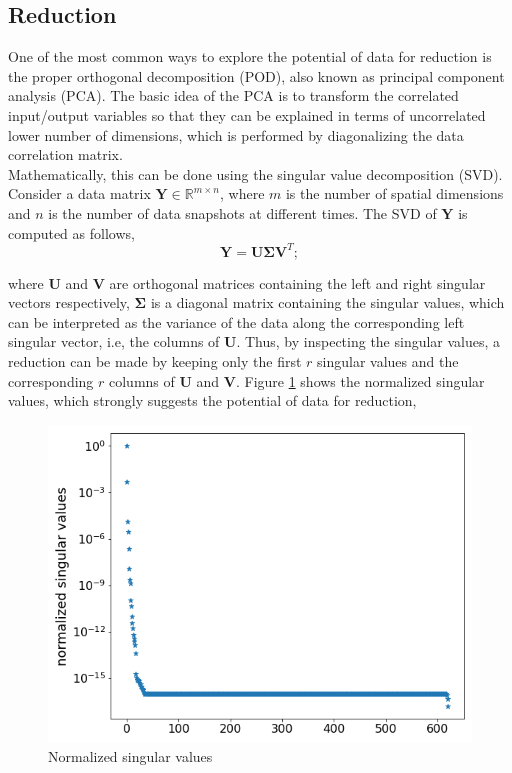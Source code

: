 \documentclass{anstrans}
\begin{document}
\subsection{Reduction}
One of the most common ways to explore the potential of data for reduction is the proper orthogonal decomposition (POD), also known as principal component analysis (PCA).
The basic idea of the PCA is to transform the correlated input/output variables so that they can be explained in terms of uncorrelated lower number of dimensions, which is performed by diagonalizing the data correlation matrix.\\
Mathematically, this can be done using the singular value decomposition (SVD). Consider a data matrix $\textbf{Y} \in \mathbb{R}^{m\times n}$,  where $m$ is the number of spatial dimensions and $n$ is the number of data snapshots at different times. The SVD of $\textbf{Y}$ is computed as follows, 
\begin{equation}
 \textbf{Y} =\textbf{U}\boldsymbol{\Sigma}\textbf{V}^T;
\end{equation}

where $\textbf{U}$ and $\textbf{V}$ are orthogonal matrices containing the left and right singular vectors respectively, $\boldsymbol{\Sigma}$ is a diagonal matrix containing the singular values, 
which can be interpreted as the variance of the data along the corresponding left singular vector, i.e, the columns of $\textbf{U}$. 
Thus, by inspecting the singular values, a reduction can be made by keeping only the first $r$ singular values and the corresponding $r$ columns of $\textbf{U}$ and $\textbf{V}$.
Figure \ref{fig:svd} shows the normalized singular values, which strongly suggests the potential of data for reduction, 
\begin{figure}[!h]
	\centering
	\includegraphics[scale=0.4]{./figs/singular_values.png}
	\caption{Normalized singular values}
	\label{fig:svd}
\end{figure}
\end{document}

